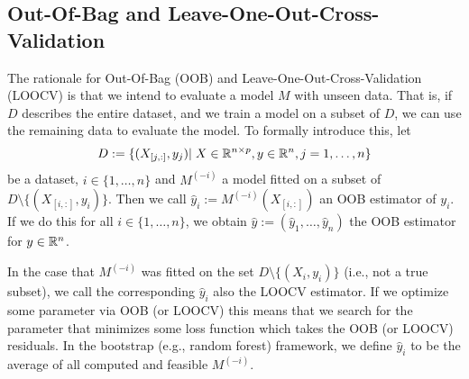 {	\subsection{Out-Of-Bag and Leave-One-Out-Cross-Validation}{ \label{sec:OOB_LOOCV}
		The rationale for Out-Of-Bag ({OOB}) and Leave-One-Out-Cross-Validation ({LOOCV}) is that we intend to evaluate a model $M$ with unseen data. That is, if $D$ describes the entire dataset, and we train a model on a subset of $D$, we can use the remaining data to evaluate the model. 
		To formally introduce this, let
		$$
			D:=\{(X_{[j,:]},y_j)|\; X\in\mathbb{R}^{n\times p}, y\in \mathbb{R}^n, j=1,\dots,n\}
		$$
		be a dataset, $i\in \{1,\dots,n\}$ and $M^{(-i)}$ a model fitted on a subset of $D\setminus\{(X_{[i,:]},y_i)\}$. Then we call $\hat y_i:= M^{(-i)}(X_{[i,:]})$ an {OOB} estimator of $y_i$. If we do this for all $i\in\{1,\dots,n\}$, we obtain $\hat y := \left(\hat y_1,\dots,\hat y_n\right)$ the OOB estimator for $y\in \mathbb{R}^n$.
		
		In the case that $M^{(-i)}$ was fitted on the set $D\setminus\{(X_i,y_i)\}$ (i.e., not a true subset), we call the corresponding $\hat y_i$ also the LOOCV estimator.	
		If we optimize some parameter via OOB (or LOOCV) this means that we search for the parameter that minimizes some loss function which takes the OOB (or LOOCV) residuals. 
		In the bootstrap (e.g., random forest) framework, we define $\hat y_i$ to be the average of all computed and feasible $M^{(-i)}$. 
	}

}
